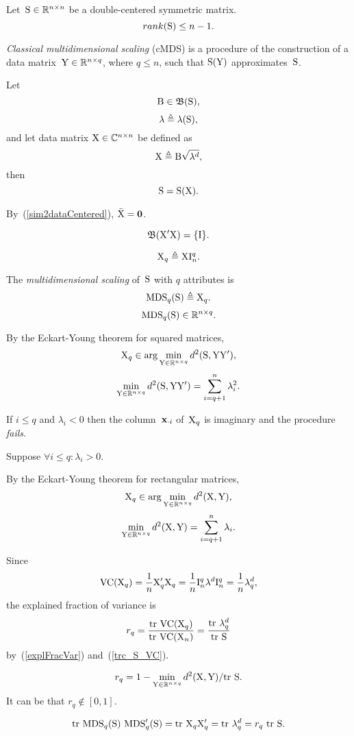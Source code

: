 \documentclass[10pt,a4paper]{article}
\theoremstyle{plain} \newtheorem{Lem}{Lemma}
\begin{document}
Let~$\mathrm S \in \mathbb R^{n \times n}$ be a double-centered symmetric matrix.
$$ rank(\mathrm S) \le n - 1. $$

{\em Classical multidimensional scaling} (cMDS) is a procedure of the construction of a data matrix~$\mathrm Y \in \mathbb R^{n \times q}$, where $q \le n$,
such that $\mathrm S(\mathrm Y)$ approximates~$\mathrm S$.

Let
$$ \mathrm B \in \mathfrak B (\mathrm S), $$
$$ \mathbf \lambda \triangleq \lambda(\mathrm S), $$
and let data matrix $\mathrm X \in \mathbb C^{n \times n}$ be defined as
$$ \mathrm X \triangleq \mathrm B \sqrt{\mathbf \lambda^d}, $$
then
$$ \mathrm S = \mathrm S(\mathrm X). $$

By~(\ref{sim2dataCentered}), $\bar {\mathrm X} = \mathbf 0$.

$$ \mathfrak B (\mathrm X' \mathrm X) = \{\mathrm I\}. $$

$$ \mathrm X_q \triangleq \mathrm X \mathrm I^q_n. $$

The {\em multidimensional scaling} of~$\mathrm S$ with $q$ attributes is
$$ \mathrm {MDS}_q(\mathrm S) \triangleq \mathrm X_q. $$
$$ \mathrm {MDS}_q(\mathrm S) \in \mathbb R^{n \times q}. $$

By the Eckart-Young theorem for squared matrices,
$$ \mathrm X_q \in \arg \min_{\mathrm Y \in \mathbb R^{n \times q}} d^2(\mathrm S, \mathrm Y \mathrm Y'), $$
$$ \min_{\mathrm Y \in \mathbb R^{n \times q}} d^2(\mathrm S, \mathrm Y \mathrm Y') = \sum_{i = q+1}^n \lambda_i^2. $$

If $i \le q$ and $\lambda_i < 0$ then the column~$\mathbf x_{\cdot i}$ of~$\mathrm X_q$ is imaginary and the procedure {\em fails}.

Suppose $\forall i \le q : \lambda_i > 0$.

By the Eckart-Young theorem for rectangular matrices,
$$ \mathrm X_q \in \arg \min_{\mathrm Y \in \mathbb R^{n \times q}} d^2(\mathrm X, \mathrm Y), $$
$$ \min_{\mathrm Y \in \mathbb R^{n \times q}} d^2(\mathrm X, \mathrm Y) = \sum_{i = q+1}^n \lambda_i. $$

Since
$$ \mathrm {VC} (\mathrm X_q)  = \frac 1 n \mathrm X_q' \mathrm X_q = \frac 1 n \mathrm I^q_n \mathbf \lambda^d \mathrm I^q_n = \frac 1 n \mathbf \lambda_q^d, $$
the explained fraction of variance is
$$ r_q = \frac {\mathrm {tr} \  \mathrm {VC} (\mathrm X_q)} {\mathrm {tr} \  \mathrm {VC} (\mathrm X_n)} = \frac {\mathrm {tr} \  \mathbf \lambda^d_q} {\mathrm {tr} \  \mathrm S} $$
by~(\ref{explFracVar}) and~(\ref{trc_S_VC}).

$$ r_q = 1 - \min_{\mathrm Y \in \mathbb R^{n \times q}} d^2(\mathrm X, \mathrm Y) / \mathrm {tr} \  \mathrm S. $$
It can be that $r_q \not \in [0,1]$.

$$ \mathrm {tr} \  \mathrm {MDS}_q(\mathrm S) \ \mathrm {MDS}_q'(\mathrm S) = \mathrm {tr} \  \mathrm X_q \mathrm X_q' = \mathrm {tr} \  \mathbf \lambda^d_q = r_q \ \mathrm {tr} \  \mathrm S. $$
\end{document}
